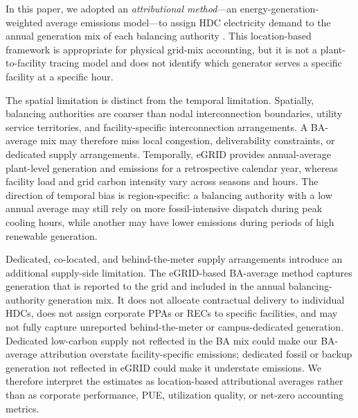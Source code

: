 \documentclass[12pt]{article}
\begin{document}
In this paper, we adopted an \textit{attributional method}---an energy-generation-weighted average emissions model---to assign HDC electricity demand to the annual generation mix of each balancing authority \cite{ekvall2005normative,nordenstam2021attributional}. This location-based framework is appropriate for physical grid-mix accounting, but it is not a plant-to-facility tracing model and does not identify which generator serves a specific facility at a specific hour.

The spatial limitation is distinct from the temporal limitation. Spatially, balancing authorities are coarser than nodal interconnection boundaries, utility service territories, and facility-specific interconnection arrangements. A BA-average mix may therefore miss local congestion, deliverability constraints, or dedicated supply arrangements. Temporally, eGRID provides annual-average plant-level generation and emissions for a retrospective calendar year, whereas facility load and grid carbon intensity vary across seasons and hours. The direction of temporal bias is region-specific: a balancing authority with a low annual average may still rely on more fossil-intensive dispatch during peak cooling hours, while another may have lower emissions during periods of high renewable generation.

Dedicated, co-located, and behind-the-meter supply arrangements introduce an additional supply-side limitation. The eGRID-based BA-average method captures generation that is reported to the grid and included in the annual balancing-authority generation mix. It does not allocate contractual delivery to individual HDCs, does not assign corporate PPAs or RECs to specific facilities, and may not fully capture unreported behind-the-meter or campus-dedicated generation. Dedicated low-carbon supply not reflected in the BA mix could make our BA-average attribution overstate facility-specific emissions; dedicated fossil or backup generation not reflected in eGRID could make it understate emissions. We therefore interpret the estimates as location-based attributional averages rather than as corporate performance, PUE, utilization quality, or net-zero accounting metrics.
\end{document}
